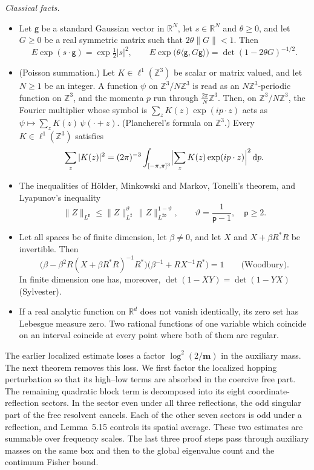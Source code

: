 \documentclass[11pt]{amsart}
\theoremstyle{definition}
\begin{document}
\emph{Classical facts.}
\begin{itemize}
\item[(K7)] Let $\mathsf g$ be a standard Gaussian vector in $\mathbb R^N$, let $s\in\mathbb R^N$ and $\theta\ge0$, and let $G\ge0$ be a real symmetric matrix such that $2\theta\|G\|<1$.
Then
\begin{equation*}
E\exp(s\cdot\mathsf g)=\exp\tfrac12|s|^2,\qquad E\exp\bigl(\theta\langle\mathsf g,G\mathsf g\rangle\bigr)=\det(1-2\theta G)^{-1/2}.
\end{equation*}
\item[(K8)] (Poisson summation.)
Let $K\in\ell^1(\mathbb Z^3)$ be scalar or matrix valued, and let $N\ge1$ be an integer.
A function $\psi$ on $\mathbb Z^3/N\mathbb Z^3$ is read as an $N\mathbb Z^3$-periodic function on $\mathbb Z^3$, and the momenta $p$ run through $\frac{2\pi}N\mathbb Z^3$.
Then, on $\mathbb Z^3/N\mathbb Z^3$, the Fourier multiplier whose symbol is $\sum_zK(z)\exp(ip\cdot z)$ acts as $\psi\mapsto\sum_zK(z)\,\psi(\cdot+z)$.
(Plancherel's formula on $\mathbb Z^3$.)
Every $K\in\ell^1(\mathbb Z^3)$ satisfies
\begin{equation*}
\sum_z|K(z)|^2=(2\pi)^{-3}\int_{[-\pi,\pi]^3}\Bigl|\sum_zK(z)\exp(ip\cdot z)\Bigr|^2\,\mathrm dp.
\end{equation*}
\item[(K9)] The inequalities of H\"older, Minkowski and Markov, Tonelli's theorem, and Lyapunov's inequality
\begin{equation*}
\|Z\|_{L^{\mathsf p}}\le\|Z\|_{L^2}^{\vartheta}\,\|Z\|_{L^{2\mathsf p}}^{1-\vartheta},\qquad\vartheta=\frac1{\mathsf p-1},\quad\mathsf p\ge2.
\end{equation*}
\item[(K10)] Let all spaces be of finite dimension, let $\beta\ne0$, and let $X$ and $X+\beta R^*R$ be invertible.
Then
\begin{equation*}
\bigl(\beta-\beta^2R(X+\beta R^*R)^{-1}R^*\bigr)\bigl(\beta^{-1}+RX^{-1}R^*\bigr)=1\qquad\text{(Woodbury)}.
\end{equation*}
In finite dimension one has, moreover, $\det(1-XY)=\det(1-YX)$ (Sylvester).
\item[(K11)] If a real analytic function on $\mathbb R^d$ does not vanish identically, its zero set has Lebesgue measure zero.
Two rational functions of one variable which coincide on an interval coincide at every point where both of them are regular.
\end{itemize}

The earlier localized estimate loses a factor $\log^2(2/\mathbf m)$
in the auxiliary mass. The next theorem removes this loss. We first
factor the localized hopping perturbation so that its high--low terms
are absorbed in the coercive free part. The remaining quadratic block
term is decomposed into its eight coordinate-reflection sectors.
In the sector even under all three reflections, the odd singular part
of the free resolvent cancels. Each of the other seven sectors is odd
under a reflection, and Lemma~5.15 controls its spatial average.
These two estimates are summable over frequency scales. The last
three proof steps pass through auxiliary masses on the same box and
then to the global eigenvalue count and the continuum Fisher bound.
\end{document}
